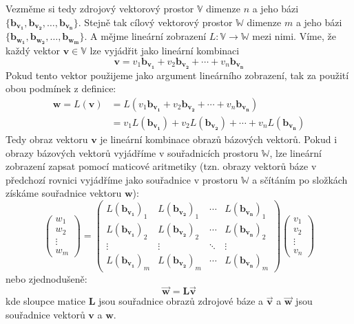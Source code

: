 \documentclass[a5paper,12pt]{amsbook}
\theoremstyle{definition}
\newcommand{\myscalar}[1]{#1}
\newcommand{\myvec}[1]{\bm{#1}}
\newcommand{\mycoord}[1]{\overrightarrow{\mathbf{#1}}}
\newcommand{\mymatrix}[1]{\mathbf{#1}}
\newcommand{\myspace}[1]{\mathbb{#1}}
\newcommand{\mymap}[1]{#1}
\begin{document}
Vezměme si tedy zdrojový vektorový prostor $\myspace{V}$ dimenze $n$ a jeho bázi 
$\{\myvec{b_{v_1}},\myvec{b_{v_2}},\ldots,\myvec{b_{v_n}}\}$. Stejně tak cílový
vektorový prostor $\myspace{W}$ dimenze $m$ a jeho bázi $\{\myvec{b_{w_1}}, \myvec{b_{w_2}},
\ldots,\myvec{b_{w_m}}\}$. A mějme lineární zobrazení $\mymap{L}: \myspace{V}\rightarrow\myspace{W}$
mezi nimi. Víme, že každý vektor $\myvec{v}\in\myspace{V}$ lze vyjádřit jako lineární kombinaci
\begin{equation*}
\myvec{v}=\myscalar{v_{1}}\myvec{b_{v_1}}+\myscalar{v_{2}}\myvec{b_{v_2}}+\cdots+\myscalar{v_{n}}
  \myvec{b_{v_n}}
\end{equation*} 
Pokud tento vektor použijeme jako argument lineárního zobrazení, tak za použití obou podmínek
z definice:
\begin{equation*}
\begin{split}
\myvec{w}=L(\myvec{v})&=\mymap{L}(\myscalar{v_{1}}\myvec{b_{v_1}}+\myscalar{v_{2}}\myvec{b_{v_2}}
    +\cdots+\myscalar{v_{n}}\myvec{b_{v_n}})\\
  &=\myscalar{v_{1}}\mymap{L}(\myvec{b_{v_1}})+\myscalar{v_{2}}\mymap{L}(\myvec{b_{v_2}})+\cdots
    +\myscalar{v_{n}}\mymap{L}(\myvec{b_{v_n}})
\end{split}
\end{equation*} 
Tedy obraz vektoru $\myvec{v}$ je lineární kombinace obrazů bázových vektorů.
Pokud i obrazy bázových vektorů vyjádříme v souřadnicích prostoru $\myspace{W}$, lze lineární
zobrazení zapsat pomocí maticové aritmetiky (tzn. obrazy vektorů báze v předchozí rovnici
vyjádříme jako souřadnice v prostoru $\myspace{W}$ a sčítáním po složkách získáme souřadnice
vektoru $\myvec{w}$):
\begin{equation*}
\left(\begin{array}{c}
w_{1}\\
w_{2}\\
\vdots\\
w_{m}
\end{array}\right)=\left(\begin{array}{cccc}
\mymap{L}(\myvec{b_{v_1}})_1 & \mymap{L}(\myvec{b_{v_2}})_1 & \cdots & \mymap{L}(\myvec{b_{v_n}})_1\\
\mymap{L}(\myvec{b_{v_1}})_2 & \mymap{L}(\myvec{b_{v_2}})_2 & \cdots & \mymap{L}(\myvec{b_{v_n}})_2\\
\vdots & \vdots & \ddots & \vdots\\
\mymap{L}(\myvec{b_{v_1}})_m & \mymap{L}(\myvec{b_{v_2}})_m & \cdots & \mymap{L}(\myvec{b_{v_n}})_m
\end{array}\right)\left(\begin{array}{c}
v_{1}\\
v_{2}\\
\vdots\\
v_{n}
\end{array}\right)
\end{equation*}
nebo zjednodušeně:
\begin{equation*}
\mycoord{w}=\mymatrix{L}\mycoord{v}
\end{equation*}
kde sloupce matice $\mymatrix{L}$ jsou souřadnice obrazů zdrojové báze a $\mycoord{v}$
a $\mycoord{w}$ jsou souřadnice vektorů $\myvec{v}$ a $\myvec{w}$.
\end{document}
